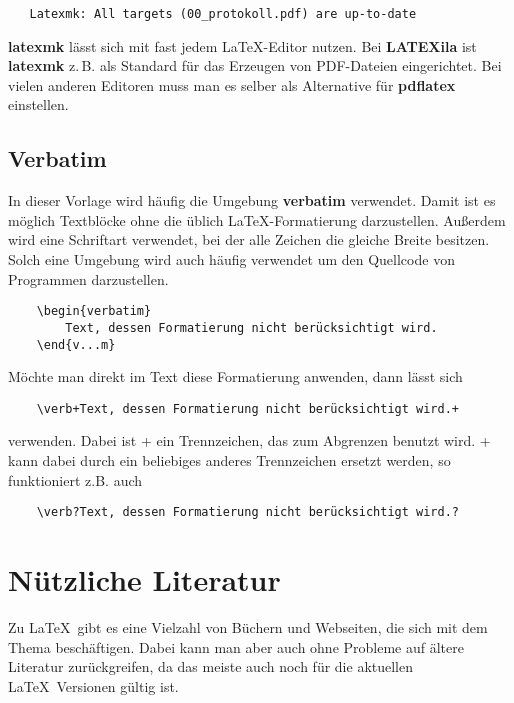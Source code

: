 \begin{verbatim}
   Latexmk: All targets (00_protokoll.pdf) are up-to-date
\end{verbatim}

\textbf{latexmk} lässt sich mit fast jedem \LaTeX-Editor nutzen. Bei \textbf{LATEXila} ist \textbf{latexmk} z.\,B. als Standard für das Erzeugen von PDF-Dateien eingerichtet. Bei vielen anderen Editoren muss man es selber als Alternative für \textbf{pdflatex} einstellen.

\subsection{Verbatim}

In dieser Vorlage wird häufig die Umgebung \textbf{verbatim} verwendet. Damit ist es möglich Textblöcke ohne die üblich \LaTeX-Formatierung darzustellen. Außerdem wird eine Schriftart verwendet, bei der alle Zeichen die gleiche Breite besitzen. Solch eine Umgebung wird auch häufig verwendet um den Quellcode von Programmen darzustellen.

\begin{verbatim}
    \begin{verbatim}
        Text, dessen Formatierung nicht berücksichtigt wird.
    \end{v...m}
\end{verbatim}

Möchte man direkt im Text diese Formatierung anwenden, dann lässt sich 

\begin{verbatim}
    \verb+Text, dessen Formatierung nicht berücksichtigt wird.+
\end{verbatim}

verwenden. Dabei ist + ein Trennzeichen, das zum Abgrenzen benutzt wird. + kann dabei durch ein beliebiges anderes Trennzeichen ersetzt werden, so funktioniert z.B. auch

\begin{verbatim}
    \verb?Text, dessen Formatierung nicht berücksichtigt wird.?
\end{verbatim}

\newpage
\section{Nützliche Literatur}

Zu \LaTeX\ gibt es eine Vielzahl von Büchern und Webseiten, die sich mit dem Thema beschäftigen. Dabei kann man aber auch ohne Probleme auf ältere Literatur zurückgreifen, da das meiste auch noch für die aktuellen \LaTeX\ Versionen gültig ist.

